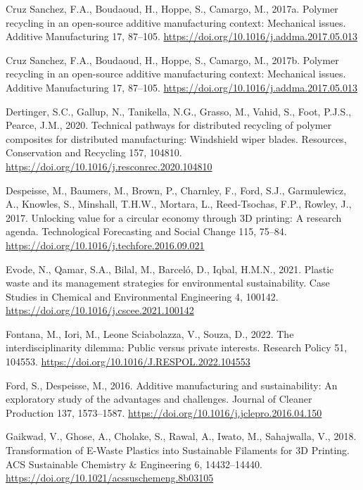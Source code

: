 \documentclass[
  12pt,
  number,
  review]{elsarticle}
\newlength{\cslhangindent}
\newlength{\cslentryspacingunit} %
\newenvironment{CSLReferences}[2] %
 {%
  \setlength{\parindent}{0pt}
  \ifodd #1
  \let\oldpar\par
  \def\par{\hangindent=\cslhangindent\oldpar}
  \fi
  \setlength{\parskip}{#2\cslentryspacingunit}
 }%
 {}
\begin{document}
\begin{CSLReferences}{1}{0}
\leavevmode{}%
Cruz Sanchez, F.A., Boudaoud, H., Hoppe, S., Camargo, M., 2017a. Polymer
recycling in an open-source additive manufacturing context: {Mechanical}
issues. Additive Manufacturing 17, 87--105.
\url{https://doi.org/10.1016/j.addma.2017.05.013}

\leavevmode{}%
Cruz Sanchez, F.A., Boudaoud, H., Hoppe, S., Camargo, M., 2017b. Polymer
recycling in an open-source additive manufacturing context: {Mechanical}
issues. Additive Manufacturing 17, 87--105.
\url{https://doi.org/10.1016/j.addma.2017.05.013}

\leavevmode{}%
Dertinger, S.C., Gallup, N., Tanikella, N.G., Grasso, M., Vahid, S.,
Foot, P.J.S., Pearce, J.M., 2020. Technical pathways for distributed
recycling of polymer composites for distributed manufacturing:
{Windshield} wiper blades. Resources, Conservation and Recycling 157,
104810. \url{https://doi.org/10.1016/j.resconrec.2020.104810}

\leavevmode{}%
Despeisse, M., Baumers, M., Brown, P., Charnley, F., Ford, S.J.,
Garmulewicz, A., Knowles, S., Minshall, T.H.W., Mortara, L.,
Reed-Tsochas, F.P., Rowley, J., 2017. Unlocking value for a circular
economy through {3D} printing: {A} research agenda. Technological
Forecasting and Social Change 115, 75--84.
\url{https://doi.org/10.1016/j.techfore.2016.09.021}

\leavevmode{}%
Evode, N., Qamar, S.A., Bilal, M., Barceló, D., Iqbal, H.M.N., 2021.
Plastic waste and its management strategies for environmental
sustainability. Case Studies in Chemical and Environmental Engineering
4, 100142. \url{https://doi.org/10.1016/j.cscee.2021.100142}

\leavevmode{}%
Fontana, M., Iori, M., Leone Sciabolazza, V., Souza, D., 2022. The
interdisciplinarity dilemma: {Public} versus private interests. Research
Policy 51, 104553. \url{https://doi.org/10.1016/J.RESPOL.2022.104553}

\leavevmode{}%
Ford, S., Despeisse, M., 2016. Additive manufacturing and
sustainability: An exploratory study of the advantages and challenges.
Journal of Cleaner Production 137, 1573--1587.
\url{https://doi.org/10.1016/j.jclepro.2016.04.150}

\leavevmode{}%
Gaikwad, V., Ghose, A., Cholake, S., Rawal, A., Iwato, M., Sahajwalla,
V., 2018. Transformation of {E-Waste Plastics} into {Sustainable
Filaments} for {3D Printing}. ACS Sustainable Chemistry \& Engineering
6, 14432--14440. \url{https://doi.org/10.1021/acssuschemeng.8b03105}


\end{CSLReferences}
\end{document}
